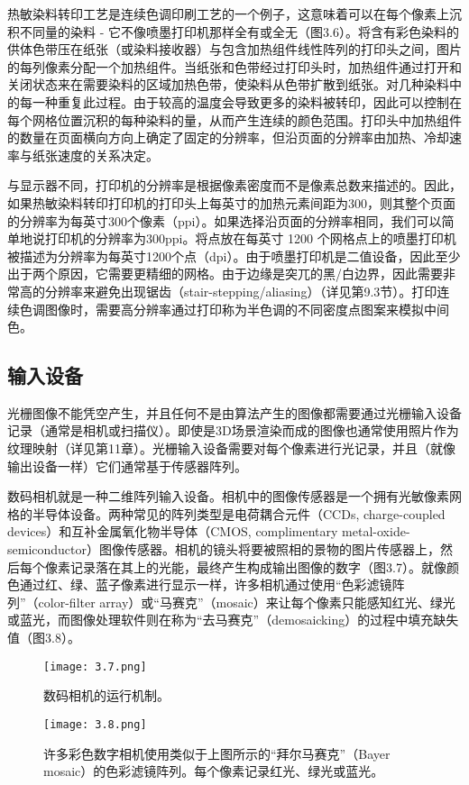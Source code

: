 \documentclass[lang=cn,12pt]{elegantbook}
\begin{document}
热敏染料转印工艺是连续色调印刷工艺的一个例子，这意味着可以在每个像素上沉积不同量的染料 - 它不像喷墨打印机那样全有或全无（图3.6）。将含有彩色染料的供体色带压在纸张（或染料接收器）与包含加热组件线性阵列的打印头之间，图片的每列像素分配一个加热组件。当纸张和色带经过打印头时，加热组件通过打开和关闭状态来在需要染料的区域加热色带，使染料从色带扩散到纸张。对几种染料中的每一种重复此过程。由于较高的温度会导致更多的染料被转印，因此可以控制在每个网格位置沉积的每种染料的量，从而产生连续的颜色范围。打印头中加热组件的数量在页面横向方向上确定了固定的分辨率，但沿页面的分辨率由加热、冷却速率与纸张速度的关系决定。

与显示器不同，打印机的分辨率是根据像素密度而不是像素总数来描述的。因此，如果热敏染料转印打印机的打印头上每英寸的加热元素间距为300，则其整个页面的分辨率为每英寸300个像素（ppi）。如果选择沿页面的分辨率相同，我们可以简单地说打印机的分辨率为300ppi。将点放在每英寸 1200 个网格点上的喷墨打印机被描述为分辨率为每英寸1200个点（dpi）。由于喷墨打印机是二值设备，因此至少出于两个原因，它需要更精细的网格。由于边缘是突兀的黑/白边界，因此需要非常高的分辨率来避免出现锯齿（stair-stepping/aliasing）（详见第9.3节）。打印连续色调图像时，需要高分辨率通过打印称为半色调的不同密度点图案来模拟中间色。


\subsection{输入设备}

光栅图像不能凭空产生，并且任何不是由算法产生的图像都需要通过光栅输入设备记录（通常是相机或扫描仪）。即使是3D场景渲染而成的图像也通常使用照片作为纹理映射（详见第11章）。光栅输入设备需要对每个像素进行光记录，并且（就像输出设备一样）它们通常基于传感器阵列。

数码相机就是一种二维阵列输入设备。相机中的图像传感器是一个拥有光敏像素网格的半导体设备。两种常见的阵列类型是电荷耦合元件（CCDs, charge-coupled devices）和互补金属氧化物半导体（CMOS, complimentary metal-oxide-semiconductor）图像传感器。相机的镜头将要被照相的景物的图片传感器上，然后每个像素记录落在其上的光能，最终产生构成输出图像的数字（图3.7）。就像颜色通过红、绿、蓝子像素进行显示一样，许多相机通过使用“色彩滤镜阵列”（color-filter array）或“马赛克”（mosaic）来让每个像素只能感知红光、绿光或蓝光，而图像处理软件则在称为“去马赛克”（demosaicking）的过程中填充缺失值（图3.8）。

\begin{figure}[htb]
  \centering
  \begin{minipage}[t]{0.45\textwidth}
  \centering
  \texttt{[image: 3.7.png]}
  \caption{数码相机的运行机制。}
  \end{minipage}
  \begin{minipage}[t]{0.45\textwidth}
  \centering
  \texttt{[image: 3.8.png]}
  \caption{许多彩色数字相机使用类似于上图所示的“拜尔马赛克”（Bayer mosaic）的色彩滤镜阵列。每个像素记录红光、绿光或蓝光。}
  \end{minipage}
\end{figure}
\end{document}

